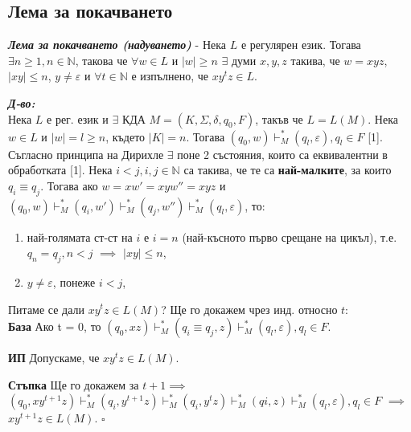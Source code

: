 \documentclass[fleqn,12pt]{article}
\begin{document}
\begin{flushleft}
\section{Лема за покачването}

\textit{\textbf{Лема за покачването (надуването)}} - Нека $L$ е регулярен език. Тогава $\exists n \geq 1, n \in \mathbb{N}$, такова че $\forall w \in L$ и $|w| \geq n$ $\exists$ думи $x, y, z$ такива, че $w = xyz$, $|xy| \leq n$, $y \neq \varepsilon$ и $\forall t \in \mathbb{N}$ е изпълнено, че $xy^tz \in L$.

\textit{\textbf{Д-во:}}\\
Нека $L$ е рег. език и $\exists$ КДА $M = (K, \Sigma, \delta, q_0, F)$, такъв че $L = L(M)$. Нека $w \in L$ и $|w| = l \geq n$, където $|K| = n$. Тогава $(q_0, w) \vdash_M^* (q_l, \varepsilon), q_l \in F$ [1]. \\
Съгласно принципа на Дирихле $\exists$ поне 2 състояния, които са еквивалентни в обработката [1]. Нека $i < j, i,j \in \mathbb{N}$ са такива, че те са \textbf{най-малките}, за които $q_i \equiv q_j$. Тогава ако $w = xw' = xyw'' = xyz$ и $(q_0, w) \vdash_M^* (q_i, w') \vdash_M^* (q_j, w'') \vdash_M^* (q_l, \varepsilon)$, то:
\begin{enumerate}
    \item най-голямата ст-ст на $i$ е $i=n$ (най-късното първо срещане на цикъл), т.е. $q_n = q_j, n < j$ $\implies$ $|xy| \leq n$,
    \item $y \neq \varepsilon$, понеже $i < j$,
\end{enumerate}

Питаме се дали $xy^tz \in L(M)$? Ще го докажем чрез инд. относно $t$: \\

\textbf{База} Ако t = 0, то $(q_0, xz) \vdash_M^* (q_i \equiv q_j, z) \vdash_M^* (q_l, \varepsilon), q_l \in F$.

\textbf{ИП} Допускаме, че $xy^tz \in L(M)$.

\textbf{Стъпка} Ще го докажем за $t+1 \implies$ \\

$(q_0, xy^{t+1}z) \vdash_M^* (q_i, y^{t+1}z) \vdash_M^* (q_i, y^tz) \vdash_M^* (qi, z) \vdash_M^* (q_l, \varepsilon), q_l \in F$ $\implies$ $xy^{t+1}z \in L(M)$. $\square$

\end{flushleft}
\end{document}
